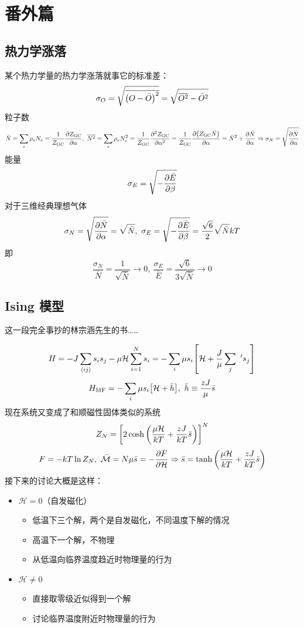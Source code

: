 \section{番外篇}

\subsection{热力学涨落}

某个热力学量的热力学涨落就事它的标准差：\[
    \sigma_{O} = \sqrt{\overline{\qty(O - \bar{O})^2}} = \sqrt{\overline{O^2} - \bar{O}^2}
\] 粒子数 \[
    \bar{N} = \sum_s \rho_s N_s = \frac{1}{Z_{\text{GC}}} \pdv{Z_{\text{GC}}}{\alpha},\ \overline{N^2} = \sum_s \rho_s N_s^2 = \frac{1}{Z_{\text{GC}}}\pdv[2]{Z_{\text{GC}}}{\alpha} = \frac{1}{Z_{\text{GC}}} \pdv{\qty(Z_{\text{GC}} \bar{N})}{\alpha} = \bar{N}^2 + \pdv{\bar{N}}{\alpha} \Rightarrow \sigma_{N} = \sqrt{\pdv{\bar{N}}{\alpha}}
\] 能量 \[
    \sigma_{E} = \sqrt{- \pdv{\bar{E}}{\beta}}
\] 对于三维经典理想气体 \[
    \sigma_{N} = \sqrt{\pdv{\bar{N}}{\alpha}} = \sqrt{\bar{N}},\ \sigma_{E} = \sqrt{- \pdv{\bar{E}}{\beta}} = \frac{\sqrt{6}}{2} \sqrt{\bar{N}} k T
\] 即 \[
    \frac{\sigma_{N}}{\bar{N}} = \frac{1}{\sqrt{\bar{N}}} \to 0,\ \frac{\sigma_{E}}{\bar{E}} = \frac{\sqrt{6}}{3 \sqrt{\bar{N}}} \to 0
\]

\subsection{Ising 模型}

这一段完全事抄的林宗涵先生的书……

\[
    H = - J \sum_{\expval{i j}}s_i s_j - \mu \mathcal{H} \sum_{i = 1}^N s_i = - \sum_i \mu s_i \qty[\mathcal{H} + \frac{J}{\mu} \sum_j \ ' s_j]
\] \[
    H_{\text{MF}} = - \sum_i \mu s_i \qty[\mathcal{H} + \bar{h}],\ \bar{h} \equiv \frac{z J}{\mu} \bar{s}
\] 现在系统又变成了和顺磁性固体类似的系统 \[
    Z_N = \qty[2 \cosh \qty(\frac{\mu \mathcal{H}}{k T} + \frac{z J}{k T} \bar{s})]^N
\] \[
    F = - k T \ln{Z_N},\ \bar{\mathcal{M}} = N \mu \bar{s} = - \pdv{F}{\mathcal{H}} \Rightarrow \bar{s} = \tanh \qty(\frac{\mu \mathcal{H}}{k T} + \frac{z J}{k T} \bar{s})
\] 接下来的讨论大概是这样：\begin{itemize}
    \item $\mathcal{H} = 0$（自发磁化） \begin{itemize}
              \item 低温下三个解，两个是自发磁化，不同温度下解的情况
              \item 高温下一个解，不物理
              \item 从低温向临界温度趋近时物理量的行为
          \end{itemize}
    \item $\mathcal{H} \neq 0$ \begin{itemize}
              \item 直接取零级近似得到一个解
              \item 讨论临界温度附近时物理量的行为
          \end{itemize}
\end{itemize}